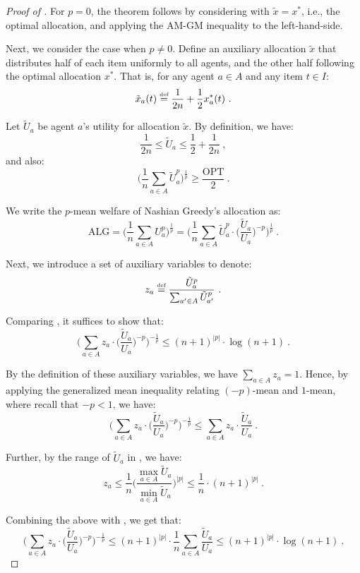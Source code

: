 \documentclass[11pt,letterpaper]{article}
\newcommand{\OPT}{\mathrm{OPT}}
\newcommand{\ALG}{\mathrm{ALG}}
\newcommand{\utility}{U}
\newcommand{\defeq}{\stackrel{\textrm{\tiny def}}{=}}
\begin{document}
\begin{proof}[Proof of ]
	For $p = 0$, the theorem follows by considering  with $\tilde{x} = x^*$, i.e., the optimal allocation, and applying the AM-GM inequality to the left-hand-side.
	
	Next, we consider the case when $p \ne 0$.
	Define an auxiliary allocation $\tilde{x}$ that distributes half of each item uniformly to all agents, and the other half following the optimal allocation $x^*$.
	That is, for any agent $a \in A$ and any item $t \in I$:
	\[
		\tilde{x}_a(t) \defeq \frac{1}{2n} + \frac{1}{2} x^*_a(t)
		~.
	\]
	
	Let $\tilde{U}_a$ be agent $a$'s utility for allocation $\tilde{x}$.
	By definition, we have:
	\begin{equation}
		\label{eqn:auxiliary-utility-range}
		\frac{1}{2n} \le \tilde{U}_a \le \frac{1}{2} + \frac{1}{2n}	
		~,
	\end{equation}
	and also:
	\begin{equation}
		\label{eqn:auxiliary-allocation-approximation}
		\bigg( \frac{1}{n} \sum_{a \in A} \tilde{\utility}_a^p \bigg)^{\frac{1}{p}} \ge \frac{\OPT}{2}
		~.
	\end{equation}
	
	We write the $p$-mean welfare of Nashian Greedy's allocation as:
	\begin{equation}
		\label{eq:nashian-p-mean-rewrite}	
		\ALG = \bigg( \frac{1}{n} \sum_{a \in A} \utility_a^p \bigg)^{\frac{1}{p}} = \bigg(\frac{1}{n} \sum_{a \in A} \tilde{\utility}_a^p \cdot \Big( \frac{\tilde{\utility}_a}{\utility_a} \Big)^{-p} \bigg)^{\frac{1}{p}}
		~.
	\end{equation}
	
	Next, we introduce a set of auxiliary variables to denote:
	\[
		z_a \defeq \frac{\tilde{\utility}_a^p}{\sum_{a' \in A} \tilde{\utility}_{a'}^p}
		~.
	\]
	
	Comparing , it suffices to show that:
	\[
		\bigg( \sum_{a \in A} z_a \cdot \Big( \frac{\tilde{\utility}_a}{\utility_a} \Big)^{-p} \bigg)^{-\frac{1}{p}} \le (n+1)^{|p|} \cdot \log(n+1)
		~.
	\]
	
	By the definition of these auxiliary variables, we have $\sum_{a \in A} z_a = 1$.
	Hence, by applying the generalized mean inequality relating $(-p)$-mean and $1$-mean, where recall that $-p < 1$, we have:
	\[
		\bigg( \sum_{a \in A} z_a \cdot \Big( \frac{\tilde{\utility}_a}{\utility_a} \Big)^{-p} \bigg)^{-\frac{1}{p}}\le \sum_{a \in A}  z_a \cdot \frac{\tilde{\utility}_a}{\utility_a}
		~.
	\]
	
	Further, by the range of $\tilde{\utility}_a$ in , we have:
	\[
		z_a \le \frac{1}{n} \bigg( \frac{\max_{a \in A} \tilde{\utility}_a}{\min_{a \in A} \tilde{\utility}_a} \bigg)^{|p|} \le \frac{1}{n} \cdot (n+1)^{|p|}
		~.
	\]
	
	Combining the above with , we get that:
	\[
		\bigg( \sum_{a \in A} z_a \cdot \Big( \frac{\tilde{\utility}_a}{\utility_a} \Big)^{-p} \bigg)^{-\frac{1}{p}}\le (n+1)^{|p|} \cdot \frac{1}{n} \sum_{a \in A} \frac{\tilde{\utility}_a}{\utility_a} \le (n+1)^{|p|} \cdot \log(n+1)
		~.
	\]
\end{proof}
\end{document}
